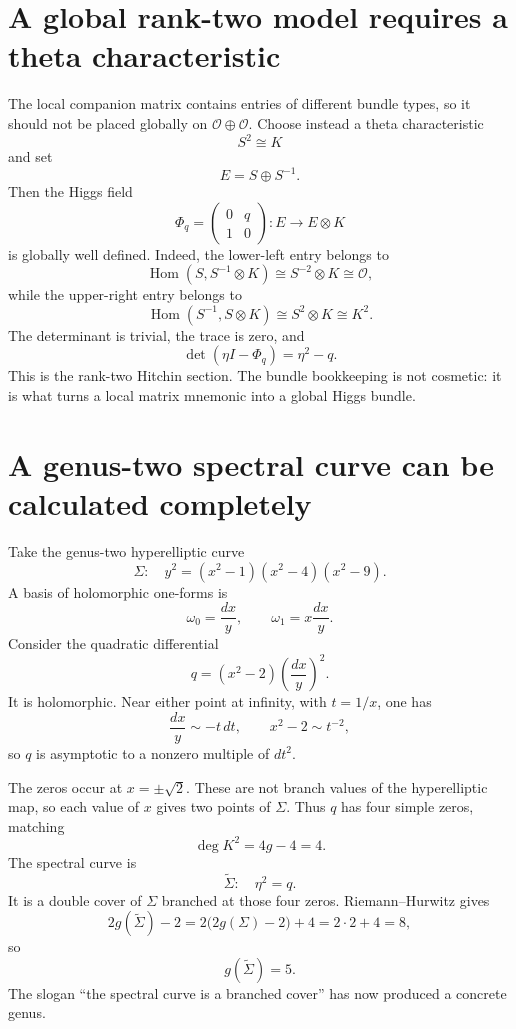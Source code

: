 \section{A global rank-two model requires a theta characteristic}

The local companion matrix contains entries of different bundle types, so it should not be placed globally on \(\mathcal O\oplus\mathcal O\).  Choose instead a theta characteristic
\[
  S^2\cong K
\]
and set
\[
  E=S\oplus S^{-1}.
\]
Then the Higgs field
\[
  \Phi_q=
  \begin{pmatrix}
    0&q\\
    1&0
  \end{pmatrix}
  :E\longrightarrow E\otimes K
\]
is globally well defined.  Indeed, the lower-left entry belongs to
\[
  \operatorname{Hom}(S,S^{-1}\otimes K)
  \cong S^{-2}\otimes K
  \cong\mathcal O,
\]
while the upper-right entry belongs to
\[
  \operatorname{Hom}(S^{-1},S\otimes K)
  \cong S^2\otimes K
  \cong K^2.
\]
The determinant is trivial, the trace is zero, and
\[
  \det(\eta I-\Phi_q)=\eta^2-q.
\]
This is the rank-two Hitchin section.  The bundle bookkeeping is not cosmetic: it is what turns a local matrix mnemonic into a global Higgs bundle.

\section{A genus-two spectral curve can be calculated completely}

Take the genus-two hyperelliptic curve
\[
  \Sigma:\quad
  y^2=(x^2-1)(x^2-4)(x^2-9).
\]
A basis of holomorphic one-forms is
\[
  \omega_0=\frac{dx}{y},
  \qquad
  \omega_1=x\frac{dx}{y}.
\]
Consider the quadratic differential
\[
  q=(x^2-2)\left(\frac{dx}{y}\right)^2.
\]
It is holomorphic.  Near either point at infinity, with \(t=1/x\), one has
\[
  \frac{dx}{y}\sim -t\,dt,
  \qquad
  x^2-2\sim t^{-2},
\]
so \(q\) is asymptotic to a nonzero multiple of \(dt^2\).

The zeros occur at \(x=\pm\sqrt2\).  These are not branch values of the hyperelliptic map, so each value of \(x\) gives two points of \(\Sigma\).  Thus \(q\) has four simple zeros, matching
\[
  \deg K^2=4g-4=4.
\]
The spectral curve is
\[
  \widetilde\Sigma:\quad \eta^2=q.
\]
It is a double cover of \(\Sigma\) branched at those four zeros.  Riemann--Hurwitz gives
\[
  2g(\widetilde\Sigma)-2
  =2\bigl(2g(\Sigma)-2\bigr)+4
  =2\cdot2+4=8,
\]
so
\[
  \boxed{g(\widetilde\Sigma)=5.}
\]
The slogan “the spectral curve is a branched cover” has now produced a concrete genus.

